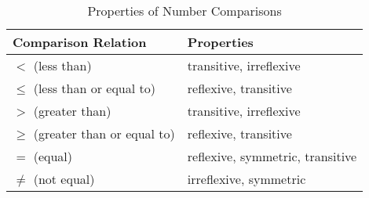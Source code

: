 \begin{table}[H]
  \centering
  \begin{tabular}{p{2in} p{3in}}
  \toprule
  \textbf{Comparison Relation} & \textbf{Properties} \\
  \midrule
  \( < \) (less than) & transitive, irreflexive \\
  \( \leq \) (less than or equal to) & reflexive, transitive \\
  \( > \) (greater than) & transitive, irreflexive \\
  \( \geq \) (greater than or equal to) & reflexive, transitive \\
  \( = \) (equal) & reflexive, symmetric, transitive \\
  \( \neq \) (not equal) & irreflexive, symmetric \\
  \bottomrule
  \end{tabular}
  \caption{Properties of Number Comparisons}
\end{table}
